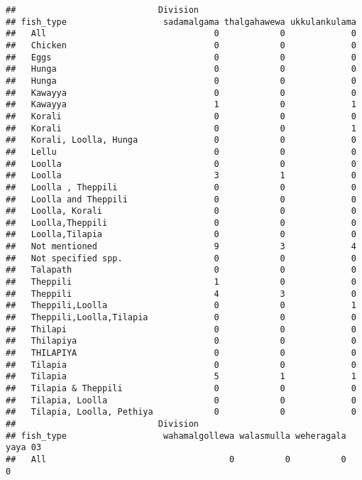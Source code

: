 \documentclass[
]{article}
\begin{document}
\begin{verbatim}
##                            Division
## fish_type                   sadamalgama thalgahawewa ukkulankulama
##   All                                 0            0             0
##   Chicken                             0            0             0
##   Eggs                                0            0             0
##   Hunga                               0            0             0
##   Hunga                               0            0             0
##   Kawayya                             0            0             0
##   Kawayya                             1            0             1
##   Korali                              0            0             0
##   Korali                              0            0             1
##   Korali, Loolla, Hunga               0            0             0
##   Lellu                               0            0             0
##   Loolla                              0            0             0
##   Loolla                              3            1             0
##   Loolla , Theppili                   0            0             0
##   Loolla and Theppili                 0            0             0
##   Loolla, Korali                      0            0             0
##   Loolla,Theppili                     0            0             0
##   Loolla,Tilapia                      0            0             0
##   Not mentioned                       9            3             4
##   Not specified spp.                  0            0             0
##   Talapath                            0            0             0
##   Theppili                            1            0             0
##   Theppili                            4            3             0
##   Theppili,Loolla                     0            0             1
##   Theppili,Loolla,Tilapia             0            0             0
##   Thilapi                             0            0             0
##   Thilapiya                           0            0             0
##   THILAPIYA                           0            0             0
##   Tilapia                             0            0             0
##   Tilapia                             5            1             1
##   Tilapia & Theppili                  0            0             0
##   Tilapia, Loolla                     0            0             0
##   Tilapia, Loolla, Pethiya            0            0             0
##                            Division
## fish_type                   wahamalgollewa walasmulla weheragala yaya 03
##   All                                    0          0          0       0

\end{verbatim}
\end{document}
